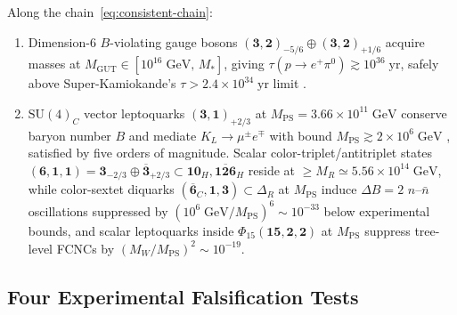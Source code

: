 \documentclass[11pt,a4paper]{article}
\begin{document}
Along the chain~\eqref{eq:consistent-chain}:
\begin{enumerate}[label=(\arabic*),leftmargin=1.8em,itemsep=2pt]
\item Dimension-$6$ $B$-violating gauge bosons $(\mathbf{3},\mathbf{2})_{-5/6} \oplus (\mathbf{3},\mathbf{2})_{+1/6}$ acquire masses at $M_{\mathrm{GUT}} \in [10^{16}\;\mathrm{GeV},\, M_*]$, giving $\tau(p \to e^+ \pi^0) \gtrsim 10^{36}\;\mathrm{yr}$, safely above Super-Kamiokande's $\tau > 2.4\times 10^{34}\;\mathrm{yr}$ limit \cite{Takenaka2020SuperK}.
\item $\mathrm{SU}(4)_C$ vector leptoquarks $(\mathbf{3},\mathbf{1})_{+2/3}$ at $M_{\mathrm{PS}} = 3.66\times 10^{11}\;\mathrm{GeV}$ conserve baryon number $B$ and mediate $K_L \to \mu^\pm e^\mp$ with bound $M_{\mathrm{PS}} \gtrsim 2\times 10^6\;\mathrm{GeV}$ \cite{ValenciaWillenbrock1994,PDG2024}, satisfied by five orders of magnitude. Scalar color-triplet/antitriplet states $(\mathbf{6},\mathbf{1},\mathbf{1}) = \mathbf{3}_{-2/3} \oplus \overline{\mathbf{3}}_{+2/3} \subset \mathbf{10}_H, \overline{\mathbf{126}}_H$ reside at $\ge M_R \simeq 5.56\times 10^{14}\;\mathrm{GeV}$, while color-sextet diquarks $(\overline{\mathbf{6}}_C,\mathbf{1},\mathbf{3}) \subset \Delta_R$ at $M_{\mathrm{PS}}$ induce $\Delta B = 2$ $n\text{--}\bar{n}$ oscillations suppressed by $(10^6\;\mathrm{GeV}/M_{\mathrm{PS}})^6 \sim 10^{-33}$ below experimental bounds, and scalar leptoquarks inside $\Phi_{15}(\mathbf{15},\mathbf{2},\mathbf{2})$ at $M_{\mathrm{PS}}$ suppress tree-level FCNCs by $(M_W/M_{\mathrm{PS}})^2 \sim 10^{-19}$.
\end{enumerate}

\subsection{Four Experimental Falsification Tests}
\label{subsec:falsification}
\end{document}
